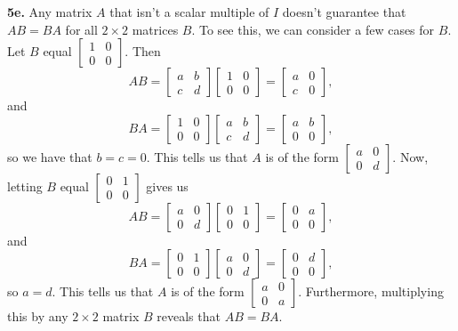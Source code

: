 \documentclass{article}
\begin{document}
\textbf{5e.} Any matrix $A$ that isn't a scalar multiple of $I$ doesn't guarantee that $AB = BA$ for all $2\times 2$ matrices $B$. To see this, we can consider a few cases for $B$. Let $B$ equal
$\begin{bmatrix}
    1 & 0 \\
    0 & 0
\end{bmatrix}.$
Then
$$AB = \begin{bmatrix}
    a & b \\
    c & d
\end{bmatrix}
\begin{bmatrix}
    1 & 0 \\
    0 & 0
\end{bmatrix}
= \begin{bmatrix}
    a & 0 \\
    c & 0
\end{bmatrix},$$
and 
$$BA = \begin{bmatrix}
    1 & 0 \\
    0 & 0
\end{bmatrix}
\begin{bmatrix}
    a & b \\
    c & d
\end{bmatrix}
= \begin{bmatrix}
    a & b \\
    0 & 0
\end{bmatrix},$$
so we have that $b = c = 0$. This tells us that $A$ is of the form
$\begin{bmatrix}
    a & 0 \\
    0 & d
\end{bmatrix}.$
Now, letting $B$ equal
$\begin{bmatrix}
    0 & 1 \\
    0 & 0
\end{bmatrix}$
gives us
$$AB = \begin{bmatrix}
    a & 0 \\
    0 & d
\end{bmatrix}
\begin{bmatrix}
    0 & 1 \\
    0 & 0
\end{bmatrix}
= \begin{bmatrix}
    0 & a \\
    0 & 0
\end{bmatrix},$$
and
$$BA = \begin{bmatrix}
    0 & 1 \\
    0 & 0
\end{bmatrix}
\begin{bmatrix}
    a & 0 \\
    0 & d
\end{bmatrix}
= \begin{bmatrix}
    0 & d \\
    0 & 0
\end{bmatrix},$$
so $a = d$. This tells us that $A$ is of the form
$\begin{bmatrix}
    a & 0 \\
    0 & a
\end{bmatrix}.$
Furthermore, multiplying this by any $2\times 2$ matrix $B$ reveals that $AB = BA$. \\
\end{document}
